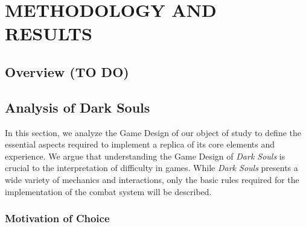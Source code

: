 \chapter{METHODOLOGY AND RESULTS}




\section{Overview (TO DO)}







\section{Analysis of Dark Souls}
\label{sec:analysis-dark-souls}

In this section, we analyze the Game Design of our object of study to define the essential aspects required to implement a replica of its core elements and experience. We argue that understanding the Game Design of \emph{Dark Souls} is crucial to the interpretation of difficulty in games. While \emph{Dark Souls} presents a wide variety of mechanics and interactions, only the basic rules required for the implementation of the combat system will be described.


\subsection{Motivation of Choice}

